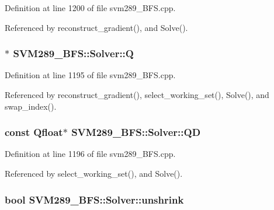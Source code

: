Definition at line 1200 of file svm289\+\_\+\+B\+F\+S.\+cpp.



Referenced by reconstruct\+\_\+gradient(), and Solve().

\subsubsection[{\texorpdfstring{Q}{Q}}]{$\ast$ S\+V\+M289\+\_\+\+B\+F\+S\+::\+Solver\+::Q\hspace{0.3cm}{\ttfamily [protected]}}\hypertarget{class_s_v_m289___b_f_s_1_1_solver_ae0494fb6f65df63e46d76059ef07e3ec}{}\label{class_s_v_m289___b_f_s_1_1_solver_ae0494fb6f65df63e46d76059ef07e3ec}


Definition at line 1195 of file svm289\+\_\+\+B\+F\+S.\+cpp.



Referenced by reconstruct\+\_\+gradient(), select\+\_\+working\+\_\+set(), Solve(), and swap\+\_\+index().

\subsubsection[{\texorpdfstring{QD}{QD}}]{\setlength{\rightskip}{0pt plus 5cm}const {\bf Qfloat}$\ast$ S\+V\+M289\+\_\+\+B\+F\+S\+::\+Solver\+::\+QD\hspace{0.3cm}{\ttfamily [protected]}}\hypertarget{class_s_v_m289___b_f_s_1_1_solver_a28e141b65ab370ba3cfad591f1060b5a}{}\label{class_s_v_m289___b_f_s_1_1_solver_a28e141b65ab370ba3cfad591f1060b5a}


Definition at line 1196 of file svm289\+\_\+\+B\+F\+S.\+cpp.



Referenced by select\+\_\+working\+\_\+set(), and Solve().

\subsubsection[{\texorpdfstring{unshrink}{unshrink}}]{\setlength{\rightskip}{0pt plus 5cm}bool S\+V\+M289\+\_\+\+B\+F\+S\+::\+Solver\+::unshrink\hspace{0.3cm}{\ttfamily [protected]}}\hypertarget{class_s_v_m289___b_f_s_1_1_solver_aacbfb24e4ebd24d420e89d1f216102be}{}\label{class_s_v_m289___b_f_s_1_1_solver_aacbfb24e4ebd24d420e89d1f216102be}


